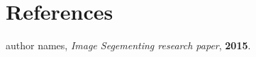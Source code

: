 \documentclass[9pt]{beamer}
\begin{document}
\section{References}
\begin{frame}
  
  \begin{thebibliography}{99}
   author names,  \newblock \emph{Image Segementing research paper}, \textbf{2015}.
  \end{thebibliography}
\end{frame}

\section{}
\begin{frame}{}
\end{frame}
\end{document}
